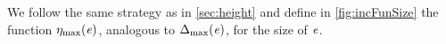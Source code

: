 
We follow the same strategy as in \cref{sec:height} and define in \cref{fig:incFunSize} the function ${\eta_{\max}}({\mathit {e}})$, analogous to ${\Delta_{\max}}({\mathit {e}})$, for the size of $\mathit {e}$.

